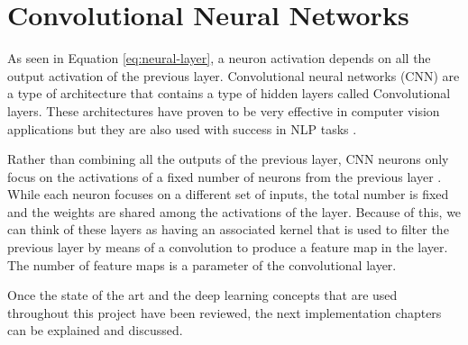 \section{Convolutional Neural Networks}

As seen in Equation \eqref{eq:neural-layer}, a neuron activation depends on all the output activation of the previous layer. Convolutional neural networks (CNN) are a type of architecture that contains a type of hidden layers called Convolutional layers. These architectures have proven to be very effective in computer vision applications but they are also used with success in NLP tasks \cite{zhang2015character}.

Rather than combining all the outputs of the previous layer, CNN neurons only focus on the activations of a fixed number of neurons from the previous layer \cite{krizhevsky2012imagenet}. While each neuron focuses on a different set of inputs, the total number is fixed and the weights are shared among the activations of the layer. Because of this, we can think of these layers as having an associated kernel that is used to filter the previous layer by means of a convolution to produce a feature map in the layer. The number of feature maps is a parameter of the convolutional layer. %

Once the state of the art and the deep learning concepts  that are used throughout this project have been reviewed, the next implementation chapters can be explained and discussed.
